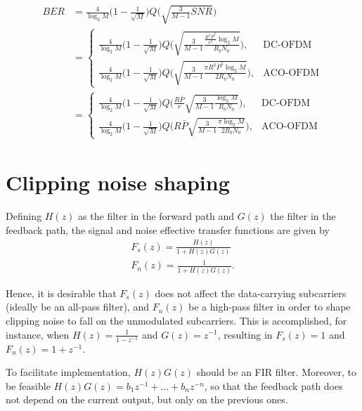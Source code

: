 \documentclass[a4paper]{article}
\begin{document}
\begin{align} \nonumber
BER &= \frac{4}{\log_2M}\bigg(1 - \frac{1}{\sqrt{M}}\bigg)Q\bigg(\sqrt{\frac{3}{M-1}SNR}\bigg) \\ 
& =\begin{cases}
\frac{4}{\log_2M}\bigg(1 - \frac{1}{\sqrt{M}}\bigg)Q\bigg(\sqrt{\frac{3}{M-1}\frac{\frac{R^2\bar{P}^2}{r^2}\log_2M}{R_bN_0}}\bigg), &\text{DC-OFDM} \\
\frac{4}{\log_2M}\bigg(1 - \frac{1}{\sqrt{M}}\bigg)Q\bigg(\sqrt{\frac{3}{M-1}\frac{\pi R^2\bar{P}^2\log_2M}{2R_bN_0}}\bigg), &\text{ACO-OFDM}
\end{cases} \\
& =\begin{cases}
\frac{4}{\log_2M}\bigg(1 - \frac{1}{\sqrt{M}}\bigg)Q\bigg(\frac{R\bar{P}}{r}\sqrt{\frac{3}{M-1}\frac{\log_2M}{R_bN_0}}\bigg), &\text{DC-OFDM} \\
\frac{4}{\log_2M}\bigg(1 - \frac{1}{\sqrt{M}}\bigg)Q\bigg(R\bar{P}\sqrt{\frac{3}{M-1}\frac{\pi\log_2M}{2R_bN_0}}\bigg), &\text{ACO-OFDM}
\end{cases}
\end{align}


\section{Clipping noise shaping}

Defining $H(z)$ as the filter in the forward path and $G(z)$ the filter in the feedback path, the signal and noise effective transfer functions are given by
\begin{align}
F_s(z) = \frac{H(z)}{1 + H(z)G(z)} \\
F_n(z) = \frac{1}{1 + H(z)G(z)}.
\end{align}

Hence, it is desirable that $F_s(z)$ does not affect the data-carrying subcarriers (ideally be an all-pass filter), and $F_n(z)$ be a high-pass filter in order to shape clipping noise to fall on the unmodulated subcarriers. This is accomplished, for instance, when $H(z) = \frac{1}{1-z^{-1}}$ and $G(z) = z^{-1}$, resulting in $F_s(z) = 1$ and $F_n(z) = 1 + z^{-1}$.

To facilitate implementation, $H(z)G(z)$ should be an FIR filter. Moreover, to be feasible $H(z)G(z) = b_1z^{-1} + \ldots + b_nz^{-n}$, so that the feedback path does not depend on the current output, but only on the previous ones. 




\end{document}
